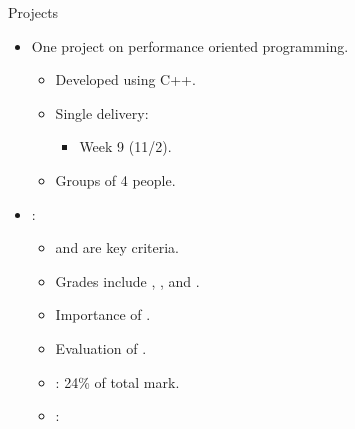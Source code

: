\begin{frame}[t]{Projects}
\begin{itemize}
  \item One project on performance oriented programming.
    \begin{itemize}
        \item Developed using C++.
        \item Single delivery:
        \begin{itemize}
          \item Week 9 (11/2).
        \end{itemize}
        \item Groups of 4 people.
    \end{itemize}

    \item {}:
      \begin{itemize}
        \item {} and  are key criteria.
        \item Grades include , , 
              and .
        \item Importance of .
        \item Evaluation of .
        \item {}: 24\% of total mark.
        \item {}: 
    \end{itemize}
\end{itemize}
\end{frame}

